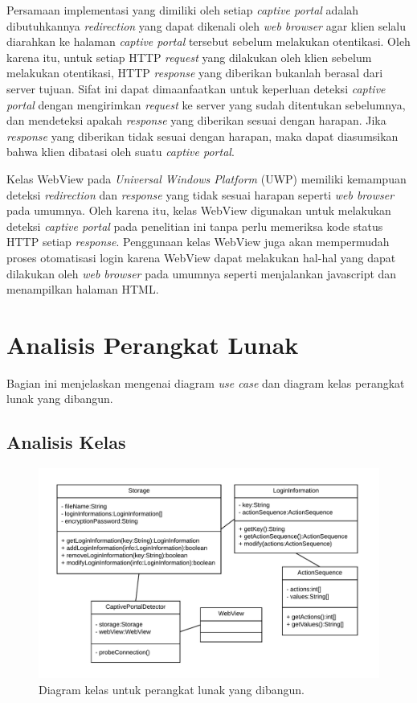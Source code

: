 Persamaan implementasi yang dimiliki oleh setiap \textit{captive portal} adalah dibutuhkannya \textit{redirection} yang dapat dikenali oleh \textit{web browser} agar klien selalu diarahkan ke halaman \textit{captive portal} tersebut sebelum melakukan otentikasi. Oleh karena itu, untuk setiap HTTP \textit{request} yang dilakukan oleh klien sebelum melakukan otentikasi, HTTP \textit{response} yang diberikan bukanlah berasal dari server tujuan. Sifat ini dapat dimaanfaatkan untuk keperluan deteksi \textit{captive portal} dengan mengirimkan \textit{request} ke server yang sudah ditentukan sebelumnya, dan mendeteksi apakah \textit{response} yang diberikan sesuai dengan harapan. Jika \textit{response} yang diberikan tidak sesuai dengan harapan, maka dapat diasumsikan bahwa klien dibatasi oleh suatu \textit{captive portal}.

Kelas WebView pada \textit{Universal Windows Platform} (UWP) memiliki kemampuan deteksi \textit{redirection} dan \textit{response} yang tidak sesuai harapan seperti \textit{web browser} pada umumnya. Oleh karena itu, kelas WebView digunakan untuk melakukan deteksi \textit{captive portal} pada penelitian ini tanpa perlu memeriksa kode status HTTP setiap \textit{response}. Penggunaan kelas WebView juga akan mempermudah proses otomatisasi login karena WebView dapat melakukan hal-hal yang dapat dilakukan oleh \textit{web browser} pada umumnya seperti menjalankan javascript dan menampilkan halaman HTML.



\section{Analisis Perangkat Lunak}
\label{sec:analisis_perangkat_lunak}

Bagian ini menjelaskan mengenai diagram \textit{use case} dan diagram kelas perangkat lunak yang dibangun.

\subsection{Analisis Kelas}
\label{sec:analisis_kelas}

\begin{figure}[h]
    \centering
    \includegraphics[scale=0.85]{Gambar/classdiagram.png}
    \caption[Diagram kelas untuk perangkat lunak yang dibangun.]{Diagram kelas untuk perangkat lunak yang dibangun.}
    \label{fig:diagramkelas}
\end{figure}

